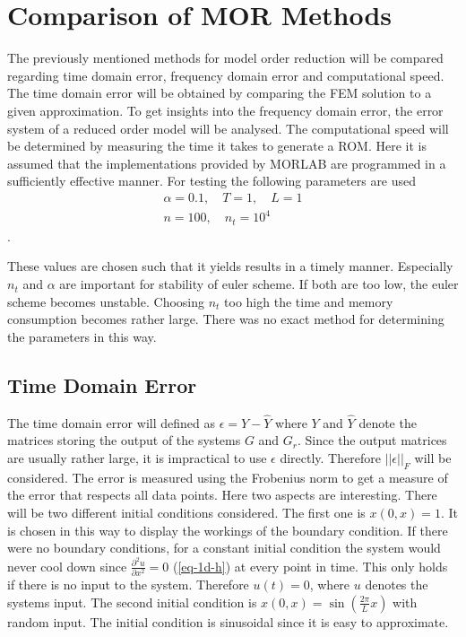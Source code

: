 \chapter{Comparison of MOR Methods} \label{analysis}
The previously mentioned methods for model order reduction will be compared regarding time domain error, frequency domain error and computational speed.
The time domain error will be obtained by comparing the FEM solution to a given approximation.
To get insights into the frequency domain error, the error system of a reduced order model will be analysed.
The computational speed will be determined by measuring the time it takes to generate a ROM.
Here it is assumed that the implementations provided by MORLAB are programmed in a sufficiently effective manner.
For testing the following parameters are used
\begin{gather}
\alpha = 0.1, \quad T = 1, \quad L = 1 \\
n = 100, \quad n_t = 10^{4}
\end{gather}
.

These values are chosen such that it yields results in a timely manner.
Especially \(n_t\) and \(\alpha\) are important for stability of euler scheme.
If both are too low, the euler scheme becomes unstable.
Choosing \(n_t\) too high the time and memory consumption becomes rather large.
There was no exact method for determining the parameters in this way.

\section{Time Domain Error}
The time domain error will defined as \(\epsilon = Y - \hat{Y}\) where \(Y\) and \(\hat{Y}\) denote the matrices storing the output of the systems \(G\) and \(G_r\).
Since the output matrices are usually rather large, it is impractical to use \(\epsilon\) directly.
Therefore  \(||\epsilon||_{F}\) will be considered.
The error is measured using the Frobenius norm to get a measure of the error that respects all data points.
Here two aspects are interesting.
There will be two different initial conditions considered.
The first one is \(x(0, x) = 1\).
It is chosen in this way to display the workings of the boundary condition.
If there were no boundary conditions, for a constant initial condition the system would never cool down since \(\frac{\partial^2 u}{\partial x^2} = 0\) (\ref{eq-1d-h}) at every point in time.
This only holds if there is no input to the system.
Therefore \(u(t) = 0\), where \(u\) denotes the systems input.
The second initial condition is \(x(0, x) = \sin(\frac{2\pi}{L}x)\) with random input.
The initial condition is sinusoidal since it is easy to approximate.


